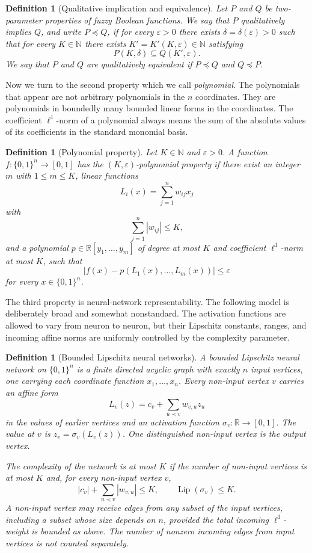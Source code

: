 \documentclass[11pt]{amsart}
\newtheorem{definition}[theorem]{Definition}
\newcommand{\R}{\mathbb R}
\newcommand{\1}{\mathbf 1}
\newcommand{\Lip}{\operatorname{Lip}}
\newcommand{\cube}{\{0,1\}}
\newcommand{\abs}[1]{\left\lvert #1\right\rvert}
\begin{document}
\begin{definition}[Qualitative implication and equivalence]\label{qeq}
Let \(P\) and \(Q\) be two-parameter properties of fuzzy Boolean functions.
We say that \(P\) qualitatively implies \(Q\), and write
\(P\preceq Q\), if for every \(\varepsilon>0\) there exists
\(\delta=\delta(\varepsilon)>0\) such that for every \(K\in\mathbb N\) there
exists \(K'=K'(K,\varepsilon)\in\mathbb N\) satisfying
\[
        P(K,\delta)\subseteq Q(K',\varepsilon).
\]
We say that \(P\) and \(Q\) are qualitatively equivalent if
\(P\preceq Q\) and \(Q\preceq P\).
\end{definition}


Now we turn to the second property which we call {\it polynomial}.  The polynomials that appear are not arbitrary polynomials in the $n$ coordinates.  They are polynomials in boundedly many bounded linear forms in the coordinates.  The coefficient $\ell^1$-norm of a polynomial always means the sum of the absolute values of its coefficients in the standard monomial basis.

\begin{definition}[Polynomial property]
Let $K\in\mathbb N$ and $\varepsilon>0$. A function
$f:\{0,1\}^n\to[0,1]$ has the $(K,\varepsilon)$-polynomial property
if there exist an integer $m$ with $1\leq m\leq K$, linear functions
\[
        L_i(x)=\sum_{j=1}^n w_{ij}x_j
\]
with
\[
        \sum_{j=1}^n |w_{ij}|\leq K,
\]
and a polynomial $p\in\mathbb R[y_1,\ldots,y_m]$ of degree at most $K$
and coefficient $\ell^1$-norm at most $K$, such that
\[
        |f(x)-p(L_1(x),\ldots,L_m(x))|\leq\varepsilon
\]
for every $x\in\{0,1\}^n$. 
\end{definition}

The third property is neural-network representability. The following model is deliberately broad and somewhat nonstandard. The activation functions are allowed to vary from neuron to neuron, but their Lipschitz constants, ranges, and incoming affine norms are uniformly controlled by the complexity parameter.

\begin{definition}[Bounded Lipschitz neural networks]
A \emph{bounded Lipschitz neural network} on $\cube^n$ is a finite directed acyclic graph with exactly $n$ input vertices, one carrying each coordinate function $x_1,\ldots,x_n$.  Every non-input vertex $v$ carries an affine form
\[
        L_v(z)=c_v+\sum_{u\prec v} w_{v,u}z_u
\]
in the values of earlier vertices and an activation function $\sigma_v:\R\to[0,1]$.  The value at $v$ is $z_v=\sigma_v(L_v(z))$.  One distinguished non-input vertex is the output vertex.

The \emph{complexity} of the network is at most $K$ if the number of non-input vertices is at most $K$ and, for every non-input vertex $v$,
\[
        \abs{c_v}+\sum_{u\prec v}\abs{w_{v,u}}\leq K,
        \qquad
        \Lip(\sigma_v)\leq K .
\]
A non-input vertex may receive edges from any subset of the input vertices, including a subset whose size depends on $n$, provided the total incoming $\ell^1$-weight is bounded as above.  The number of nonzero incoming edges from input vertices is not counted separately.
\end{definition}
\end{document}
